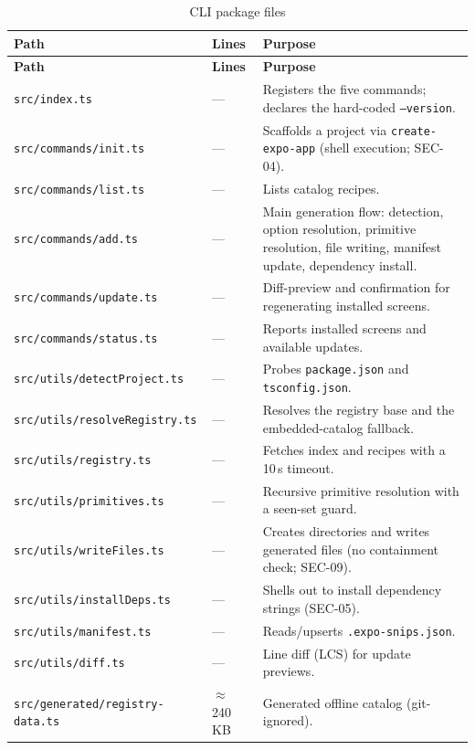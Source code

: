 \begin{longtable}{@{}L{6cm}L{2.2cm}L{6.2cm}@{}}
\caption{CLI package files}\\
\toprule
\textbf{Path} & \textbf{Lines} & \textbf{Purpose} \\
\midrule
\endfirsthead
\toprule
\textbf{Path} & \textbf{Lines} & \textbf{Purpose} \\
\midrule
\endhead
\texttt{src/index.ts} & --- & Registers the five commands; declares the
hard-coded \texttt{--version}. \\
\texttt{src/commands/init.ts} & --- & Scaffolds a project via
\texttt{create-expo-app} (shell execution; SEC-04). \\
\texttt{src/commands/list.ts} & --- & Lists catalog recipes. \\
\texttt{src/commands/add.ts} & --- & Main generation flow: detection, option
resolution, primitive resolution, file writing, manifest update, dependency
install. \\
\texttt{src/commands/update.ts} & --- & Diff-preview and confirmation for
regenerating installed screens. \\
\texttt{src/commands/status.ts} & --- & Reports installed screens and available
updates. \\
\texttt{src/utils/detectProject.ts} & --- & Probes \texttt{package.json} and
\texttt{tsconfig.json}. \\
\texttt{src/utils/resolveRegistry.ts} & --- & Resolves the registry base and the
embedded-catalog fallback. \\
\texttt{src/utils/registry.ts} & --- & Fetches index and recipes with a 10\,s
timeout. \\
\texttt{src/utils/primitives.ts} & --- & Recursive primitive resolution with a
seen-set guard. \\
\texttt{src/utils/writeFiles.ts} & --- & Creates directories and writes generated
files (no containment check; SEC-09). \\
\texttt{src/utils/installDeps.ts} & --- & Shells out to install dependency strings
(SEC-05). \\
\texttt{src/utils/manifest.ts} & --- & Reads/upserts \texttt{.expo-snips.json}. \\
\texttt{src/utils/diff.ts} & --- & Line diff (LCS) for update previews. \\
\texttt{src/generated/registry-data.ts} & $\approx$240\,KB & Generated offline
catalog (git-ignored). \\
\bottomrule
\end{longtable}

